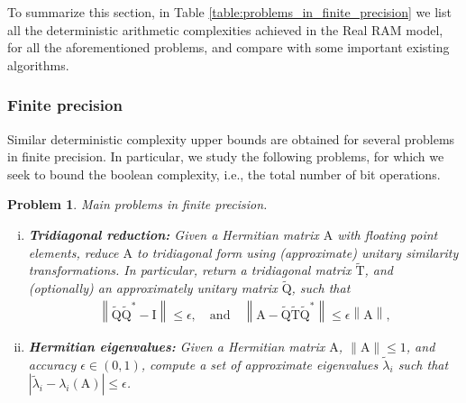 \documentclass{article}
\newcommand{\labs}{\left|}
\newcommand{\rabs}{\right|}
\newcommand{\lnorm}{\left\|}
\newcommand{\rnorm}{\right\|}
\newtheorem{problem}{Problem}[section]
\newcommand\matA{\boldsymbol{\mathrm{A}}}
\newcommand\matI{\boldsymbol{\mathrm{I}}}
\newcommand\matQtilde{\widetilde{\boldsymbol{\mathrm{Q}}}}
\newcommand\matTtilde{\widetilde{\boldsymbol{\mathrm{T}}}}
\begin{document}
To summarize this section, in Table \ref{table:problems_in_finite_precision} we list all the deterministic arithmetic complexities achieved in the Real RAM model, for all the aforementioned problems, and compare with some important existing algorithms.


\subsubsection{Finite precision}
\label{paragraph:intro_finite_precision} Similar deterministic complexity upper bounds are obtained for several problems in finite precision. In particular, we study the following problems, for which we seek to bound the boolean complexity, i.e., the total number of bit operations.
\begin{problem}
    \label{problem:problems_in_finite_precision}
    Main problems in finite precision.
    \begin{enumerate}[(i)]
        \item \textbf{Tridiagonal reduction:} Given a Hermitian matrix $\matA$ with floating point elements, reduce $\matA$ to tridiagonal form using (approximate) unitary similarity transformations. In particular, return a tridiagonal matrix $\matTtilde$, and (optionally)  an approximately unitary matrix $\matQtilde$, such that \begin{align*}
            \lnorm \matQtilde\matQtilde^*-\matI\rnorm \leq \epsilon,
            \quad
            \text{and}
            \quad
            \lnorm \matA - \matQtilde\matTtilde\matQtilde^* \rnorm \leq \epsilon \lnorm \matA \rnorm,
            \end{align*} 
        \item \textbf{Hermitian eigenvalues:} Given a Hermitian matrix $\matA$, $\|\matA\|\leq 1$, and accuracy $\epsilon\in(0,1)$, compute a set of approximate eigenvalues $\widetilde\lambda_i$ such that $\labs \widetilde\lambda_i-\lambda_i(\matA)\rabs \leq \epsilon$.
    \end{enumerate}
\end{problem}
\end{document}
